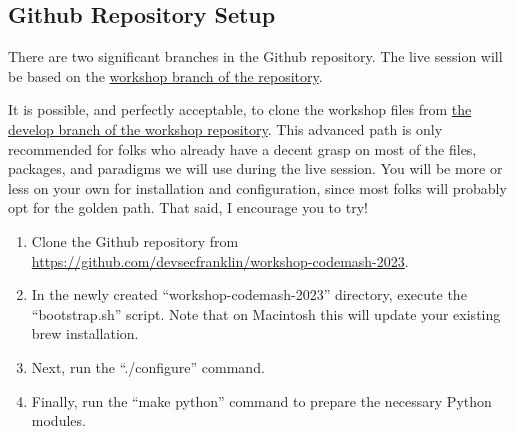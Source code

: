 \subsection{\label{sec:repo}Github Repository Setup}

\justifying
There are two significant branches in the Github repository. The live session will be based on the \href{https://github.com/devsecfranklin/workshop-codemash-2023/tree/workshop}{workshop branch of the repository}.
\vspace{2mm}

\justifying
It is possible, and perfectly acceptable, to clone the workshop files from \href{https://github.com/devsecfranklin/workshop-codemash-2023/tree/develop}{the develop branch of the workshop repository}. This 
advanced path is only recommended for folks who already have a  decent grasp on most of the files, packages, and paradigms we will
use during the live session. You will be more or less on your own for installation and configuration, since most folks will probably
opt for the golden path. That said, I encourage you to try!
\vspace{2mm}

\justifying
\begin{raggedright}
	\begin{enumerate}
		\item Clone the Github repository from \href{https://github.com/devsecfranklin/workshop-codemash-2023}{https://github.com/devsecfranklin/workshop-codemash-2023}.
		\item In the newly created ``workshop-codemash-2023'' directory, execute the ``bootstrap.sh'' script. Note that on Macintosh this will update your existing brew installation.
		\item Next, run the ``./configure'' command.
		\item Finally, run the ``make python'' command to prepare the necessary Python modules.
	\end{enumerate}
\end{raggedright}
\vspace{2mm}

